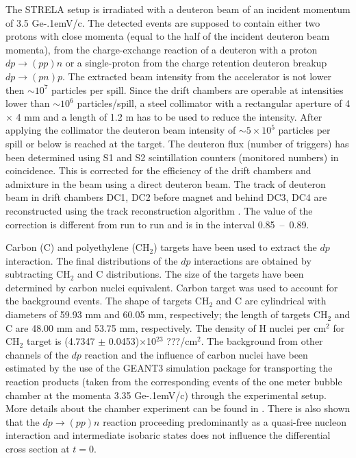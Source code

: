 \documentclass[twocolumn,epjc3]{svjour3}
\newcommand{\dpchex} {\ensuremath{dp \rightarrow (pp)n}\xspace}
\newcommand{\dpret}  {\ensuremath{dp \rightarrow (pn)p}\xspace}
\newcommand{\GeVc}   {Ge\kern-.1emV/c\xspace}
\begin{document}
The STRELA setup is irradiated with a deuteron beam of an incident momentum of
3.5 \GeVc. The detected events are supposed to contain either two protons with
close momenta (equal to the half of the incident deuteron beam momenta), from
the charge-exchange reaction of a deuteron with a proton \dpchex or a
single-proton from the charge retention deuteron breakup \dpret. The extracted
beam intensity from the accelerator is not lower then $\sim 10^{7}$ particles
per spill. Since the drift chambers are operable at intensities lower than
$\sim 10^{6}$ particles/spill, a steel collimator with a rectangular aperture of
4 $\times$ 4 mm and a length of 1.2 m has to be used to reduce the intensity.
After applying the collimator the deuteron beam intensity of $\sim 5\times10^5$
particles per spill or below is reached at the target. The deuteron flux (number
of triggers) has been determined using S1 and S2 scintillation counters
(monitored numbers) in coincidence. This is corrected for the efficiency of the
drift chambers and admixture in the beam using a direct deuteron beam. The track
of deuteron beam in drift chambers DC1, DC2 before magnet and behind DC3, DC4
are reconstructed using the track reconstruction algorithm \cite{gla13}. The
value of the correction is different from run to run and is in the interval
0.85~--~0.89.

Carbon (C) and polyethylene (CH$_2$) targets have been used to extract the $dp$
interaction. The final distributions of the $dp$ interactions are obtained by
subtracting CH$_2$ and C distributions. The size of the targets have been
determined by carbon nuclei equivalent. Carbon target was used to account for
the background events. The shape of targets CH$_2$ and C are cylindrical with
diameters of 59.93 mm and 60.05 mm, respectively; the length of targets CH$_2$
and C are 48.00 mm and 53.75 mm, respectively. The density of H nuclei per
cm$^2$ for CH$_2$ target is (4.7347 $\pm$ 0.0453)$\times$10$^{23}$ ???/cm$^2$.
The background from other channels of the $dp$ reaction and the influence of
carbon nuclei have been estimated by the use of the GEANT3 simulation package
for transporting the reaction products (taken from the corresponding events of
the one meter bubble chamber at the momenta 3.35 \GeVc) through the experimental
setup. More details about the chamber experiment can be found in
\cite{gla02,gla08}. There is also shown that the \dpchex reaction proceeding
predominantly as a quasi-free nucleon interaction and intermediate isobaric
states does not influence the differential cross section at $t = 0$.
\end{document}
